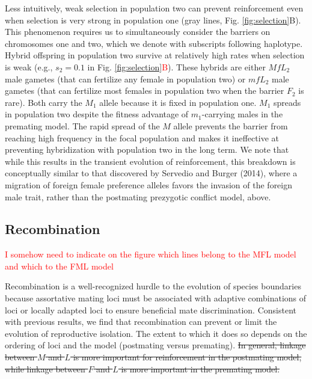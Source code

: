 \documentclass[11pt]{article}
\begin{document}
Less intuitively, weak selection in population two can prevent reinforcement even when selection is very strong in population one (gray lines, Fig. \ref{fig:selection}B).  
This phenomenon requires us to simultaneously consider the barriers on chromosomes one and two, which we denote with subscripts following haplotype. 
Hybrid offspring in population two survive at relatively high rates when selection is weak (e.g., $s_2 = 0.1$ in Fig. \ref{fig:selection}\textcolor{red}{B}).  
These hybrids are either $MfL_2$ male gametes (that can fertilize any female in population two) or $mfL_2$ male gametes (that can fertilize most females in population two when the barrier $F_2$ is rare). 
Both carry the $M_1$ allele because it is fixed in population one. 
$M_1$ spreads in population two despite the fitness advantage of $m_1$-carrying males in the premating model.  
The rapid spread of the $M$ allele prevents the barrier from reaching high frequency in the focal population and makes it ineffective at preventing hybridization with population two in the long term.   
We note that while this results in the transient evolution of reinforcement, this breakdown is conceptually similar to that discovered by Servedio and Burger (2014), where a migration of foreign female preference alleles favors the invasion of the foreign male trait, rather than the postmating prezygotic conflict model, above. 

\subsection*{Recombination}\label{section:recomb}
\textcolor{red}{I somehow need to indicate on the figure which lines belong to the MFL model and which to the FML model}

Recombination is a well-recognized hurdle to the evolution of species boundaries because assortative mating loci must be associated with adaptive combinations of loci or locally adapted loci to ensure beneficial mate discrimination. Consistent with previous results, we find that recombination can prevent or limit the evolution of reproductive isolation. The extent to which it does so depends on the ordering of loci and the model (postmating versus premating).  \sout{In general, linkage between $M$ and $L$ is more important for reinforcement in the postmating model, while linkage between $F$ and $L$ is more important in the premating model.  }
\end{document}
